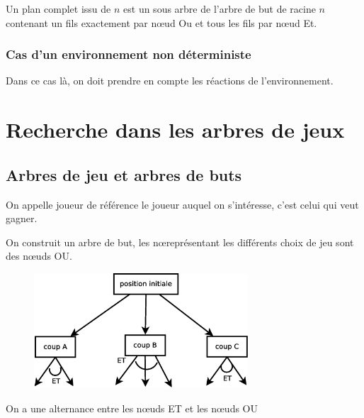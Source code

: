 \documentclass[12pt,a4paper,openany]{book}
\begin{document}
	\begin{definition}
		Un plan complet issu de $n$ est un sous arbre de l'arbre de but de racine $n$ contenant un fils exactement par nœud Ou et tous les fils par
		nœud Et.
	\end{definition}

	\subsection{Cas d'un environnement non déterministe}
	Dans ce cas là, on doit prendre en compte les réactions de l'environnement.
	\chapter{Recherche dans les arbres de jeux}
	\section{Arbres de jeu et arbres de buts}
		On appelle joueur de référence le joueur auquel on
		s'intéresse, c'est celui qui veut gagner.

		On construit un arbre de but, les n\oe{}représentant
		les différents choix de jeu sont des n\oe{}uds OU.
		 \begin{figure}[H]
			 \centering
			 \includegraphics[width=8cm]{ch4_1_1.eps}
		 \end{figure}

	\begin{remarque}
		On a une alternance entre les nœuds ET et les nœuds OU

	\end{remarque}
\end{document}
